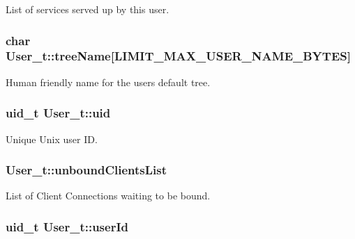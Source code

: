 List of services served up by this user. 

\subsubsection[{\texorpdfstring{tree\+Name}{treeName}}]{\setlength{\rightskip}{0pt plus 5cm}char User\+\_\+t\+::tree\+Name\mbox{[}{\bf L\+I\+M\+I\+T\+\_\+\+M\+A\+X\+\_\+\+U\+S\+E\+R\+\_\+\+N\+A\+M\+E\+\_\+\+B\+Y\+T\+ES}\mbox{]}}\hypertarget{struct_user__t_a78c367f8581be8d7730d6872ce62f038}{}\label{struct_user__t_a78c367f8581be8d7730d6872ce62f038}


Human friendly name for the user\textquotesingle{}s default tree. 

\subsubsection[{\texorpdfstring{uid}{uid}}]{\setlength{\rightskip}{0pt plus 5cm}uid\+\_\+t User\+\_\+t\+::uid}\hypertarget{struct_user__t_a70214a251b71042f97f742d4479c0898}{}\label{struct_user__t_a70214a251b71042f97f742d4479c0898}


Unique Unix user ID. 

\subsubsection[{\texorpdfstring{unbound\+Clients\+List}{unboundClientsList}}]{ User\+\_\+t\+::unbound\+Clients\+List}\hypertarget{struct_user__t_a941a342563c51929f5346e251096ee49}{}\label{struct_user__t_a941a342563c51929f5346e251096ee49}


List of Client Connections waiting to be bound. 

\subsubsection[{\texorpdfstring{user\+Id}{userId}}]{\setlength{\rightskip}{0pt plus 5cm}uid\+\_\+t User\+\_\+t\+::user\+Id}\hypertarget{struct_user__t_abed6504aa2662c12e5e2808c3a80f0f8}{}\label{struct_user__t_abed6504aa2662c12e5e2808c3a80f0f8}


